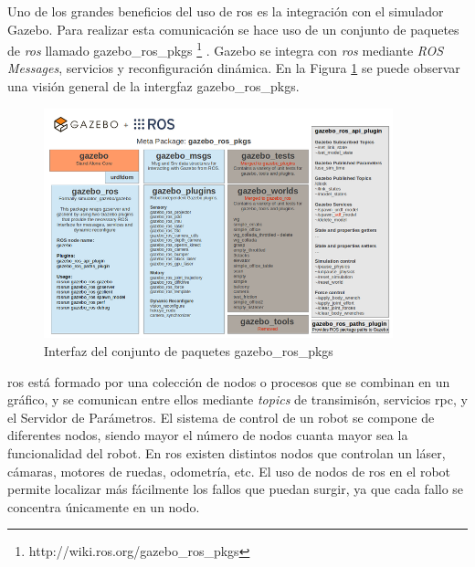 Uno de los grandes beneficios del uso de \acrshort{ros} es la integración con el simulador Gazebo. Para realizar esta comunicación se hace uso de un conjunto de paquetes de \textit{ros} llamado gazebo\_ros\_pkgs \footnote{http://wiki.ros.org/gazebo\_ros\_pkgs} \cite{ros_integration}. Gazebo se integra con \textit{ros} mediante \textit{ROS Messages}, servicios y reconfiguración dinámica. En la Figura \ref{fig.ros} se puede observar una visión general de la intergfaz gazebo\_ros\_pkgs.\\


\begin{figure}[H]
  \begin{center}
    \includegraphics[width=0.9\textwidth]{figures/Estado_arte/ros.png}
		\caption{Interfaz del conjunto de paquetes gazebo\_ros\_pkgs}
		\label{fig.ros}
		\end{center}
\end{figure}


\acrshort{ros} está formado por una colección de nodos o procesos que se combinan en un gráfico, y se comunican entre ellos mediante \textit{topics} de transimisón, servicios \acrshort{rpc}, y el Servidor de Parámetros. El sistema de control de un robot se compone de diferentes nodos, siendo mayor el número de nodos cuanta mayor sea la funcionalidad del robot. En \acrshort{ros} existen distintos nodos que controlan un láser, cámaras, motores de ruedas, odometría, etc. El uso de nodos de \acrshort{ros} en el robot permite localizar más fácilmente los fallos que puedan surgir, ya que cada fallo se concentra únicamente en un nodo.\\

